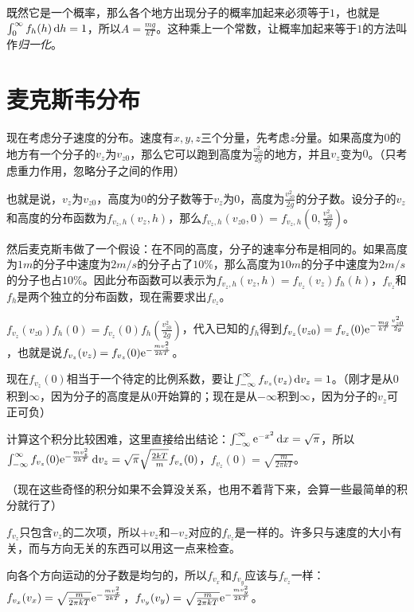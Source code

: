 既然它是一个概率，那么各个地方出现分子的概率加起来必须等于$1$，也就是$\int_0^\infty f_h(h) \mathop{}\!\mathrm{d} h=1$，所以$A=\frac{m g}{k T}$。这种乘上一个常数，让概率加起来等于$1$的方法叫作\emph{归一化}。
\section{麦克斯韦分布}
现在考虑分子速度的分布。速度有$x,y,z$三个分量，先考虑$z$分量。如果高度为$0$的地方有一个分子的$v_z$为$v_{z 0}$，那么它可以跑到高度为$\frac{v_{z 0}^2}{2 g}$的地方，并且$v_z$变为$0$。（只考虑重力作用，忽略分子之间的作用）

也就是说，$v_z$为$v_{z 0}$，高度为$0$的分子数等于$v_z$为$0$，高度为$\frac{v_{z 0}^2}{2 g}$的分子数。设分子的$v_z$和高度的分布函数为$f_{v_z,h}(v_z,h)$，那么$f_{v_z,h}(v_{z 0},0)=f_{v_z,h}(0,\frac{v_{z 0}^2}{2 g})$。

然后麦克斯韦做了一个假设：在不同的高度，分子的速率分布是相同的。如果高度为$1 \unit{m}$的分子中速度为$2 \unit{m/s}$的分子占了$10\%$，那么高度为$10 \unit{m}$的分子中速度为$2 \unit{m/s}$的分子也占$10\%$。因此分布函数可以表示为$f_{v_z,h}(v_z,h)=f_{v_z}(v_z) f_h(h)$，$f_{v_z}$和$f_h$是两个独立的分布函数，现在需要求出$f_{v_z}$。

$f_{v_z}(v_{z 0}) f_h(0)=f_{v_z}(0) f_h(\frac{v_{z 0}^2}{2 g})$，代入已知的$f_h$得到$f_{v_z}(v_{z 0})=f_{v_z}(0) \mathrm{e}^{-\frac{m g}{k T} \frac{v_{z 0}^2}{2 g}}$，也就是说$f_{v_z}(v_z)=f_{v_z}(0) \mathrm{e}^{-\frac{m v_z^2}{2 k T}}$。

现在$f_{v_z}(0)$相当于一个待定的比例系数，要让$\int_{-\infty}^\infty f_{v_z}(v_z) \mathop{}\!\mathrm{d} v_z=1$。（刚才是从$0$积到$\infty$，因为分子的高度是从$0$开始算的；现在是从$-\infty$积到$\infty$，因为分子的$v_z$可正可负）

计算这个积分比较困难，这里直接给出结论：$\int_{-\infty}^\infty \mathrm{e}^{-x^2} \mathop{}\!\mathrm{d} x=\sqrt{\pi}$，所以$\int_{-\infty}^\infty f_{v_z}(0) \mathrm{e}^{-\frac{m v_z^2}{2 k T}} \mathop{}\!\mathrm{d} v_z=\sqrt{\pi} \sqrt{\frac{2 k T}{m}} f_{v_z}(0)$，$f_{v_z}(0)=\sqrt{\frac{m}{2 \pi k T}}$。

（现在这些奇怪的积分如果不会算没关系，也用不着背下来，会算一些最简单的积分就行了）

$f_{v_z}$只包含$v_z$的二次项，所以$+v_z$和$-v_z$对应的$f_{v_z}$是一样的。许多只与速度的大小有关，而与方向无关的东西可以用这一点来检查。

向各个方向运动的分子数是均匀的，所以$f_{v_x}$和$f_{v_y}$应该与$f_{v_z}$一样：$f_{v_x}(v_x)=\sqrt{\frac{m}{2 \pi k T}} \mathrm{e}^{-\frac{m v_x^2}{2 k T}}$，$f_{v_y}(v_y)=\sqrt{\frac{m}{2 \pi k T}} \mathrm{e}^{-\frac{m v_y^2}{2 k T}}$。

